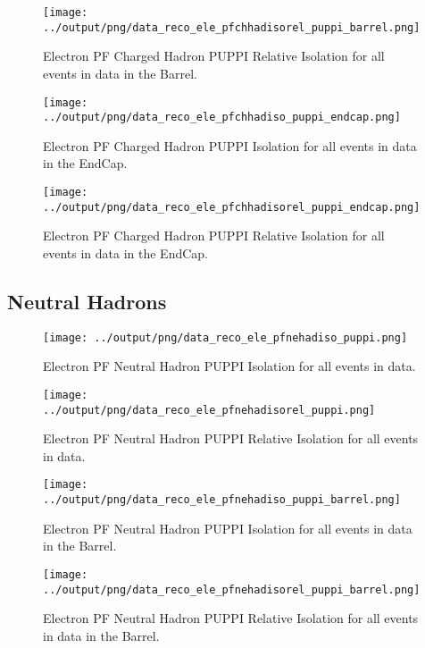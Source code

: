 \documentclass[11pt]{book}
\begin{document}
\begin{figure}[htb]
\centering
\texttt{[image: ../output/png/data\_reco\_ele\_pfchhadisorel\_puppi\_barrel.png]}
\caption{Electron PF Charged Hadron PUPPI Relative Isolation for all events in data in the Barrel.}
\label{fig:data_ele_pfchhadisorel_puppi_barrel}
\end{figure}

\begin{figure}[htb]
\centering
\texttt{[image: ../output/png/data\_reco\_ele\_pfchhadiso\_puppi\_endcap.png]}
\caption{Electron PF Charged Hadron PUPPI Isolation for all events in data in the EndCap.}
\label{fig:data_ele_pfchhadiso_puppi_endcap}
\end{figure}

\begin{figure}[htb]
\centering
\texttt{[image: ../output/png/data\_reco\_ele\_pfchhadisorel\_puppi\_endcap.png]}
\caption{Electron PF Charged Hadron PUPPI Relative Isolation for all events in data in the EndCap.}
\label{fig:data_ele_pfchhadisorel_puppi_endcap}
\end{figure}
\clearpage

\subsection{Neutral Hadrons}
\begin{figure}[htb]
\centering
\texttt{[image: ../output/png/data\_reco\_ele\_pfnehadiso\_puppi.png]}
\caption{Electron PF Neutral Hadron PUPPI Isolation for all events in data.}
\label{fig:data_ele_pfnehadiso_puppi}
\end{figure}

\begin{figure}[htb]
\centering
\texttt{[image: ../output/png/data\_reco\_ele\_pfnehadisorel\_puppi.png]}
\caption{Electron PF Neutral Hadron PUPPI Relative Isolation for all events in data.}
\label{fig:data_ele_pfnehadisorel_puppi}
\end{figure}

\begin{figure}[htb]
\centering
\texttt{[image: ../output/png/data\_reco\_ele\_pfnehadiso\_puppi\_barrel.png]}
\caption{Electron PF Neutral Hadron PUPPI Isolation for all events in data in the Barrel.}
\label{fig:data_ele_pfnehadiso_puppi_barrel}
\end{figure}

\begin{figure}[htb]
\centering
\texttt{[image: ../output/png/data\_reco\_ele\_pfnehadisorel\_puppi\_barrel.png]}
\caption{Electron PF Neutral Hadron PUPPI Relative Isolation for all events in data in the Barrel.}
\label{fig:data_ele_pfnehadisorel_puppi_barrel}
\end{figure}
\end{document}
